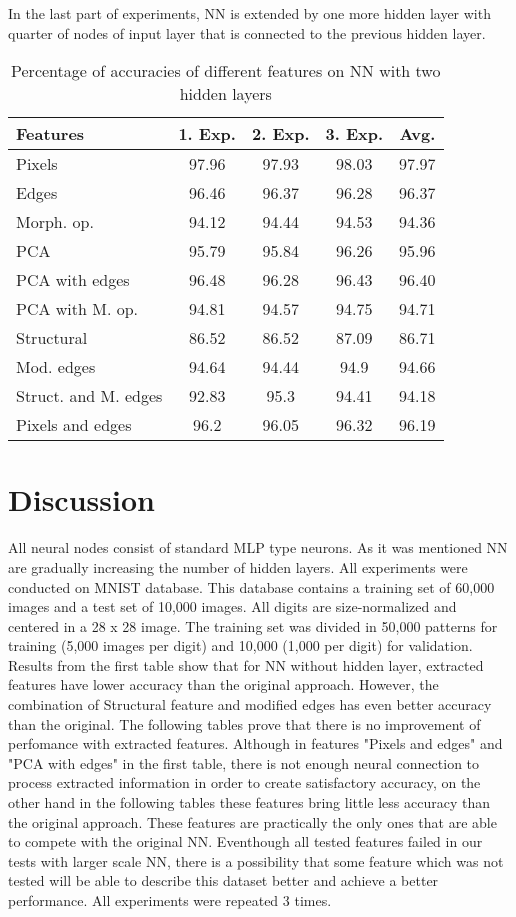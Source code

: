 \documentclass[journal]{IEEEtran}
\begin{document}
In the last part of experiments, NN is extended by one more hidden layer with quarter of nodes of input layer that is connected to the previous hidden layer.
\begin{table}
  \centering
  \caption{Percentage of accuracies of different features on NN with two hidden layers}
  \begin{tabular}{|l||c|c|c|c|}
  \hline
    Features & 1. Exp. & 2. Exp. & 3. Exp. & Avg. \\
  \hline
  \hline
  Pixels & 97.96 & 97.93 & 98.03 & 97.97 \\
  \hline
  Edges & 96.46 & 96.37 &  96.28 &  96.37 \\ 
  \hline
 Morph. op. & 94.12 & 94.44 & 94.53 & 94.36\\
 \hline
 PCA & 95.79 & 95.84 & 96.26 & 95.96\\
 \hline
 PCA with edges & 96.48 &   96.28 &  96.43 & 96.40 \\
 \hline
 PCA with M. op. &  94.81 & 94.57 & 94.75 & 94.71\\
 \hline
 Structural &  86.52 &  86.52 & 87.09 &  86.71\\
 \hline
 Mod. edges & 94.64 &  94.44 &  94.9 &  94.66\\
 \hline
 Struct. and M. edges & 92.83 & 95.3 &  94.41 &  94.18\\
 \hline
 Pixels and edges & 96.2 & 96.05 &  96.32 & 96.19\\
 \hline
  \end{tabular}
  \label{tab:extab3}
\end{table}


\section{Discussion}
All neural nodes consist of standard MLP type neurons. As it was mentioned NN are gradually increasing the number of hidden layers. All experiments were conducted on MNIST database.
This database contains a training set of 60,000 images  and  a  test  set  of  10,000  images.  All  digits are size-normalized  and  centered  in  a  28  x  28  image.  The training  set  was  divided  in  50,000  patterns  for  training (5,000 images per digit) and 10,000 (1,000 per digit) for validation. Results from the first table show that for NN without hidden layer, extracted features have lower accuracy than the original approach. However, the combination of Structural feature and modified edges has even better accuracy than the original. The following tables prove that there is no improvement of perfomance with extracted features. Although in features "Pixels and edges" and "PCA with edges" in the first table, there is not enough neural connection to process extracted information in order to create satisfactory accuracy, on the other hand in the following tables these features bring little less accuracy than the original approach. These features are practically the only ones that are able to compete with the original NN. Eventhough all tested features failed in our tests with larger scale NN, there is a possibility that some feature which was not tested will be able to describe this dataset better and achieve a better performance. All experiments were repeated 3 times. 
\end{document}
